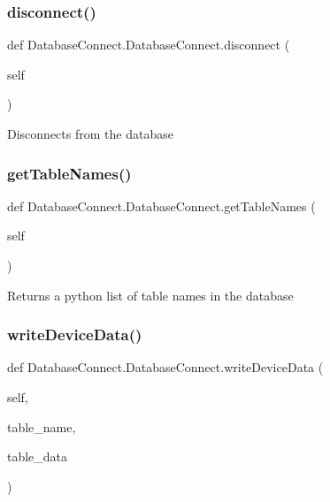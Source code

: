 \subsubsection{\texorpdfstring{disconnect()}{disconnect()}}
{\footnotesize\ttfamily def Database\+Connect.\+Database\+Connect.\+disconnect (\begin{DoxyParamCaption}\item[{}]{self }\end{DoxyParamCaption})}

\begin{DoxyVerb}Disconnects from the database\end{DoxyVerb}
 \mbox{\label{classDatabaseConnect_1_1DatabaseConnect_a243061ffa39df83640aa72b8fb234772}} 
\subsubsection{\texorpdfstring{get\+Table\+Names()}{getTableNames()}}
{\footnotesize\ttfamily def Database\+Connect.\+Database\+Connect.\+get\+Table\+Names (\begin{DoxyParamCaption}\item[{}]{self }\end{DoxyParamCaption})}

\begin{DoxyVerb}Returns a python list of table names in the database\end{DoxyVerb}
 \mbox{\label{classDatabaseConnect_1_1DatabaseConnect_a9bcba3ce08f6076f76336bb8294c4bef}} 
\subsubsection{\texorpdfstring{write\+Device\+Data()}{writeDeviceData()}}
{\footnotesize\ttfamily def Database\+Connect.\+Database\+Connect.\+write\+Device\+Data (\begin{DoxyParamCaption}\item[{}]{self,  }\item[{}]{table\+\_\+name,  }\item[{}]{table\+\_\+data }\end{DoxyParamCaption})}

